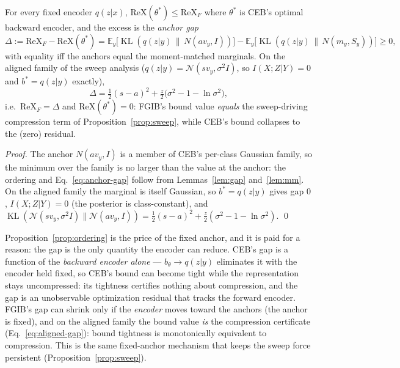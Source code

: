 \begin{proposition}\label{prop:ordering}
For every fixed encoder $q(z|x)$,
$\mathrm{ReX}(\theta^*) \le \mathrm{ReX}_F$ where $\theta^*$ is CEB's optimal backward
encoder, and the excess is the \emph{anchor gap}
\begin{equation}
\Delta := \mathrm{ReX}_F - \mathrm{ReX}(\theta^*)
= \mathbb{E}_y\big[\operatorname{KL}(q(z|y)\,\|\,N(a v_y, I))\big]
- \mathbb{E}_y\big[\operatorname{KL}(q(z|y)\,\|\,N(m_y, S_y))\big] \ge 0 ,
\label{eq:anchor-gap}
\end{equation}
with equality iff the anchors equal the moment-matched marginals.
On the aligned family of the sweep analysis ($q(z|y) = \mathcal{N}(s v_y, \sigma^2 I)$,
so $I(X;Z|Y) = 0$ and $b^* = q(z|y)$ exactly),
\begin{equation}
\Delta = \tfrac{1}{2}(s-a)^2 + \tfrac{z}{2}\big(\sigma^2 - 1 - \ln\sigma^2\big) ,
\label{eq:aligned-gap}
\end{equation}
i.e.\ $\mathrm{ReX}_F = \Delta$ and $\mathrm{ReX}(\theta^*) = 0$: FGIB's bound value
\emph{equals} the sweep-driving compression term of Proposition~\ref{prop:sweep}, while
CEB's bound collapses to the (zero) residual.
\end{proposition}

\begin{proof}
The anchor $N(a v_y, I)$ is a member of CEB's per-class Gaussian family, so the minimum
over the family is no larger than the value at the anchor: the ordering and
Eq.~\eqref{eq:anchor-gap} follow from Lemmas~\ref{lem:gap} and~\ref{lem:mm}.
On the aligned family the marginal is itself Gaussian, so $b^* = q(z|y)$ gives gap $0$,
$I(X;Z|Y) = 0$ (the posterior is class-constant), and
$\operatorname{KL}(\mathcal{N}(s v_y, \sigma^2 I)\|\mathcal{N}(a v_y, I))
= \tfrac{1}{2}(s-a)^2 + \tfrac{z}{2}(\sigma^2-1-\ln\sigma^2)$. \hfill\qed
\end{proof}

\begin{remark}\label{rem:force}
Proposition~\ref{prop:ordering} is the price of the fixed anchor, and it is paid for a
reason: the gap is the only quantity the encoder can reduce. CEB's gap is a function of
the \emph{backward encoder alone} --- $b_\theta \to q(z|y)$ eliminates it with the
encoder held fixed, so CEB's bound can become tight while the representation stays
uncompressed: its tightness certifies nothing about compression, and the gap is an
unobservable optimization residual that tracks the forward encoder. FGIB's gap can
shrink only if the \emph{encoder} moves toward the anchors (the anchor is fixed), and on
the aligned family the bound value \emph{is} the compression certificate
(Eq.~\eqref{eq:aligned-gap}): bound tightness is monotonically equivalent to
compression. This is the same fixed-anchor mechanism that keeps the sweep force
persistent (Proposition~\ref{prop:sweep}).
\end{remark}

